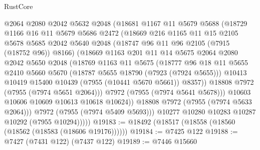\begin{lexlean}{RustCore}
\begin{coremodule}
                @2064
                @2080
                @2042
                @5632
                @2048
                (@18681
                  @1167
                  @11
                  @5679
                  @5688
                  (@18729
                    @1166
                    @16
                    @11
                    @5679
                    @5686
                    @2472
                    (@18669
                      @216
                      @1165
                      @11
                      @15
                      @2105
                      @5678
                      @5685
                      @2042
                      @5640
                      @2048
                      (@18747 @96 @11 @96 @2105 (@7915 (@18752 @96)) @8166)
                      (@18669
                        @1163
                        @201
                        @11
                        @14
                        @5675
                        @2064
                        @2080
                        @2042
                        @5650
                        @2048
                        (@18769
                          @1163
                          @11
                          @5675
                          (@18777
                            @96
                            @18
                            @11
                            @5655
                            @2410
                            @5660
                            @5670
                            (@18787 @5655 @18790 (@7923 (@7924 @5655)))
                            @10413
                            @10419
                            @15400
                            @10439
                            (@7955 (@10441 @5670 @5661))
                            @8357))
                        @18808
                        @7972
                        (@7955 (@7974 @5651 @2064)))
                      @7972
                      (@7955 (@7974 @5641 @5678)))
                    @10603
                    @10606
                    @10609
                    @10613
                    @10618
                    @10624))
                @18808
                @7972
                (@7955 (@7974 @5633 @2064)))
              @7972
              (@7955 (@7974 @5409 @5693)))
            @10277
            @10280
            @10283
            @10287
            @10292
            (@7955 @10294)))))
@19183 := @18492 (@18517 (@18558 (@18560 (@18562 (@18583 (@18606 @19176))))))
@19184 := @7425 @122
@19188 := @7427 (@7431 @122) (@7437 @122)
@19189 := @7446 @15660

\end{coremodule}
\end{lexlean}
